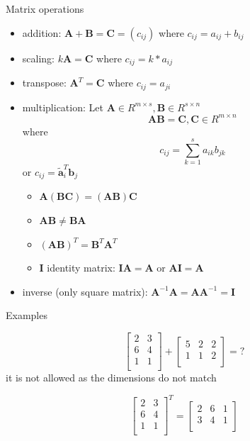 \documentclass{scrartcl}
\def\tightlist{}
\newcommand{\vv}[1]{\boldsymbol{#1}}
\begin{document}
\begin{frame}{Matrix operations}
\protect\hypertarget{matrix-operations}{}

\begin{itemize}
\tightlist
\item
  addition: \(\vv{A} +\vv{B} =\vv{C}=(c_{ij})\) where
  \(c_{ij} = a_{ij} +b_{ij}\)
\item
  scaling: \(k\vv{A}= \vv{C}\) where \(c_{ij} =k* a_{ij}\)
\item
  transpose: \(\vv{A}^T = \vv{C}\) where \(c_{ij} = a_{ji}\)
\item
  multiplication: Let
  \(\vv{A}\in R^{m\times s}, \vv{B} \in R^{s\times n}\)
  \[\vv{AB} = \vv{C}, \vv{C} \in R^{m\times n}\] where
  \[c_{ij} = \sum_{k=1}^s a_{ik}b_{jk}\] or
  \(c_{ij} = \vv{\tilde{a}}_i^T\vv{b}_j\)

  \begin{itemize}
  \tightlist
  \item
    \(\vv{A}(\vv{BC}) =(\vv{AB})\vv{C}\)
  \item
    \(\vv{AB} \neq \vv{BA}\)
  \item
    \((\vv{AB})^T = \vv{B}^T \vv{A}^T\)
  \item
    \(\vv{I}\) identity matrix: \(\vv{I}\vv{A} = \vv{A}\) or
    \(\vv{AI}=\vv{A}\)
  \end{itemize}
\item
  inverse (only square matrix):
  \(\vv{A}^{-1} \vv{A}= \vv{AA}^{-1} =\vv{I}\)
\end{itemize}

\end{frame}

\begin{frame}{Examples}
\protect\hypertarget{examples}{}

\[
\begin{bmatrix}2&3 \\6&4 \\1&1 \\\end{bmatrix} + \begin{bmatrix}5&2&2 \\1&1&2 \\\end{bmatrix}  = ?
\] \pause it is not allowed as the dimensions do not match

\[
\begin{bmatrix}2&3 \\6&4 \\1&1 \\\end{bmatrix}^T   = \begin{bmatrix}2&6&1 \\3&4&1 \\\end{bmatrix}
\]

\end{frame}
\end{document}
